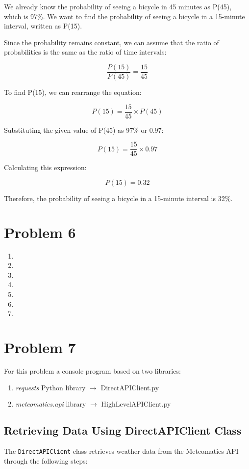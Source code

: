 	We already know the probability of seeing a bicycle in 45 minutes as P(45), which is 97\%. We want to find the probability of seeing a bicycle in a 15-minute interval, written as P(15).
	
	Since the probability remains constant, we can assume that the ratio of probabilities is the same as the ratio of time intervals:
	
	\[
	\frac{{P(15)}}{{P(45)}} = \frac{{15}}{{45}}\]
	
	To find P(15), we can rearrange the equation:
	
	\[P(15) = \frac{{15}}{{45}} \times P(45)\]
	
	Substituting the given value of P(45) as 97\% or 0.97:
	
	\[P(15) = \frac{{15}}{{45}} \times 0.97\]
	
	Calculating this expression:
	
	\[P(15) = 0.32\]
	
	Therefore, the probability of seeing a bicycle in a 15-minute interval is 32\%.

	\newpage
	\section*{Problem 6}\label{sec:prob-6}
	\begin{enumerate}
	\item 
	\item 
	\item 
	\item 
	\item 
	\item 
	\item 
	\end{enumerate}

	\newpage
	\section*{Problem 7}\label{sec:prob-7}
	For this problem a console program based on two libraries:
	\begin{enumerate}
	\item 	\textit{requests} Python library $ \rightarrow $ DirectAPIClient.py
	\item 	\textit{meteomatics.api} library $ \rightarrow $ HighLevelAPIClient.py
	\end{enumerate}
	
	\subsection*{Retrieving Data Using DirectAPIClient Class}
	The \texttt{DirectAPIClient} class retrieves weather data from the Meteomatics API through the following steps:
	
